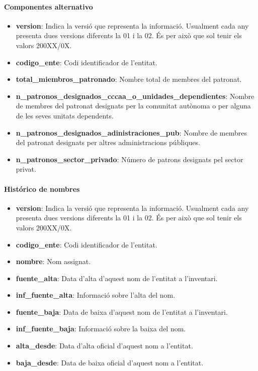 \documentclass[12pt]{article}
\begin{document}
\paragraph{Componentes alternativo\\}
\begin{itemize}
    \item \textbf{version}: Indica la versió que representa la informació. Usualment cada any presenta dues versions diferents la 01 i la 02. És per això que sol tenir els valors 200XX/0X.
    \item \textbf{codigo\_ente}: Codi identificador de l'entitat.
    \item \textbf{total\_miembros\_patronado}: Nombre total de membres del patronat.
    \item \textbf{n\_patronos\_designados\_cccaa\_o\_unidades\_dependientes}: Nombre de membres del patronat designats per la comunitat autònoma o per alguna de les seves unitats dependents.
    \item \textbf{n\_patronos\_designados\_adinistraciones\_pub}: Nombre de membres del patronat designats per altres administracions públiques.
    \item \textbf{n\_patronos\_sector\_privado}: Número de patrons designats pel sector privat.
\end{itemize}

\paragraph{Histórico de nombres\\}
\begin{itemize}
    \item \textbf{version}: Indica la versió que representa la informació. Usualment cada any presenta dues versions diferents la 01 i la 02. És per això que sol tenir els valors 200XX/0X.
    \item \textbf{codigo\_ente}: Codi identificador de l'entitat.
    \item \textbf{nombre}: Nom assignat.
    \item \textbf{fuente\_alta}: Data d'alta d'aquest nom de l'entitat a l'inventari.
    \item \textbf{inf\_fuente\_alta}: Informació sobre l'alta del nom.
    \item \textbf{fuente\_baja}: Data de baixa d'aquest nom de l'entitat a l'inventari.
    \item \textbf{inf\_fuente\_baja}: Informació sobre la baixa del nom.
    \item \textbf{alta\_desde}: Data d'alta oficial d'aquest nom a l'entitat.
    \item \textbf{baja\_desde}: Data de baixa oficial d'aquest nom a l'entitat.
\end{itemize}
\end{document}
